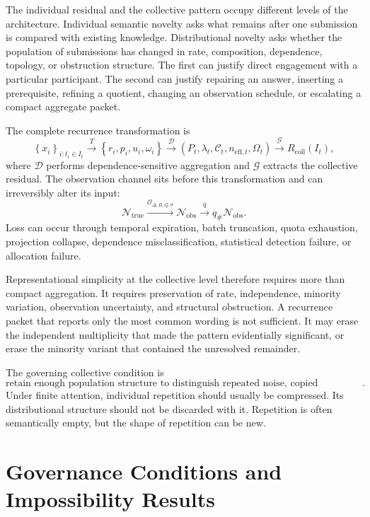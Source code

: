\documentclass[11pt]{article}
\theoremstyle{definition}
\begin{document}
The individual residual and the collective pattern occupy different levels of the architecture. Individual semantic novelty asks what remains after one submission is compared with existing knowledge. Distributional novelty asks whether the population of submissions has changed in rate, composition, dependence, topology, or obstruction structure. The first can justify direct engagement with a particular participant. The second can justify repairing an answer, inserting a prerequisite, refining a quotient, changing an observation schedule, or escalating a compact aggregate packet.

The complete recurrence transformation is
\[
\left\{
x_i
\right\}_{i:t_i\in I_t}
\xrightarrow{T}
\left\{
r_i,p_i,u_i,\omega_i
\right\}
\xrightarrow{\mathcal{D}}
\left(
P_t,
\lambda_t,
\mathcal{C}_t,
n_{\mathrm{eff},t},
\Omega_t
\right)
\xrightarrow{\mathcal{G}}
R_{\mathrm{coll}}(I_t),
\]
where \(\mathcal{D}\) performs dependence-sensitive aggregation and \(\mathcal{G}\) extracts the collective residual. The observation channel sits before this transformation and can irreversibly alter its input:
\[
\mathcal{N}_{\mathrm{true}}
\xrightarrow{\mathcal{O}_{\Delta,B,Q,\sigma}}
\mathcal{N}_{\mathrm{obs}}
\xrightarrow{q}
q_{\#}\mathcal{N}_{\mathrm{obs}}.
\]
Loss can occur through temporal expiration, batch truncation, quota exhaustion, projection collapse, dependence misclassification, statistical detection failure, or allocation failure.

Representational simplicity at the collective level therefore requires more than compact aggregation. It requires preservation of rate, independence, minority variation, observation uncertainty, and structural obstruction. A recurrence packet that reports only the most common wording is not sufficient. It may erase the independent multiplicity that made the pattern evidentially significant, or erase the minority variant that contained the unresolved remainder.

The governing collective condition is
\[
\text{retain enough population structure to distinguish repeated noise, copied amplification, independent rediscovery, curricular failure, archive failure, and genuine domain change}.
\]
Under finite attention, individual repetition should usually be compressed. Its distributional structure should not be discarded with it. Repetition is often semantically empty, but the shape of repetition can be new.


\section{Governance Conditions and Impossibility Results}
\end{document}
